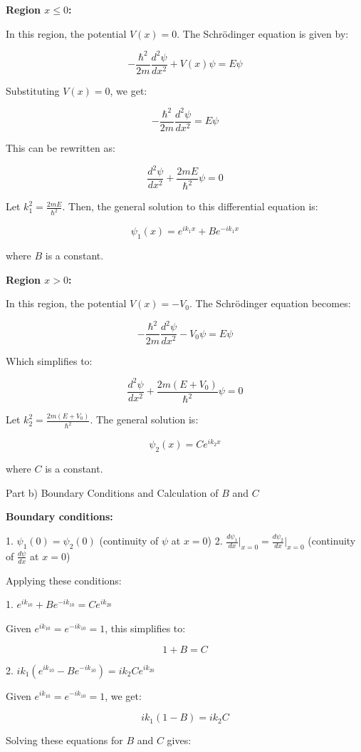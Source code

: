 \textbf{Region \(x \leq 0\):}

In this region, the potential \(V(x) = 0\). The Schrödinger equation is given by:

\[
-\frac{\hbar^2}{2m} \frac{d^2\psi}{dx^2} + V(x)\psi = E\psi
\]

Substituting \(V(x) = 0\), we get:

\[
-\frac{\hbar^2}{2m} \frac{d^2\psi}{dx^2} = E\psi
\]

This can be rewritten as:

\[
\frac{d^2\psi}{dx^2} + \frac{2mE}{\hbar^2}\psi = 0
\]

Let \(k_1^2 = \frac{2mE}{\hbar^2}\). Then, the general solution to this differential equation is:

\[
\psi_1(x) = e^{ik_1x} + Be^{-ik_1x}
\]

where \(B\) is a constant.

\textbf{Region \(x > 0\):}

In this region, the potential \(V(x) = -V_0\). The Schrödinger equation becomes:

\[
-\frac{\hbar^2}{2m} \frac{d^2\psi}{dx^2} - V_0\psi = E\psi
\]

Which simplifies to:

\[
\frac{d^2\psi}{dx^2} + \frac{2m(E+V_0)}{\hbar^2}\psi = 0
\]

Let \(k_2^2 = \frac{2m(E+V_0)}{\hbar^2}\). The general solution is:

\[
\psi_2(x) = Ce^{ik_2x}
\]

where \(C\) is a constant.

Part b) Boundary Conditions and Calculation of \(B\) and \(C\)

\textbf{Boundary conditions:}

1. \(\psi_1(0) = \psi_2(0)\) (continuity of \(\psi\) at \(x=0\))
2. \(\frac{d\psi_1}{dx}\bigg|_{x=0} = \frac{d\psi_2}{dx}\bigg|_{x=0}\) (continuity of \(\frac{d\psi}{dx}\) at \(x=0\))

Applying these conditions:

1. \(e^{ik_10} + Be^{-ik_10} = Ce^{ik_20}\)

Given \(e^{ik_10} = e^{-ik_10} = 1\), this simplifies to:

\[
1 + B = C
\]

2. \(ik_1(e^{ik_10} - Be^{-ik_10}) = ik_2Ce^{ik_20}\)

Given \(e^{ik_10} = e^{-ik_10} = 1\), we get:

\[
ik_1(1 - B) = ik_2C
\]

Solving these equations for \(B\) and \(C\) gives:

